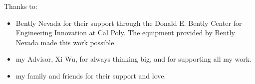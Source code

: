 \noindent
Thanks to:
\begin{itemize}
    \item Bently Nevada for their support through the Donald E. Bently Center for Engineering Innovation at Cal Poly. The equipment provided by Bently Nevada made this work possible.
    \item my Advisor, Xi Wu, for always thinking big, and for supporting all my work.
    \item my family and friends for their support and love.
\end{itemize}

